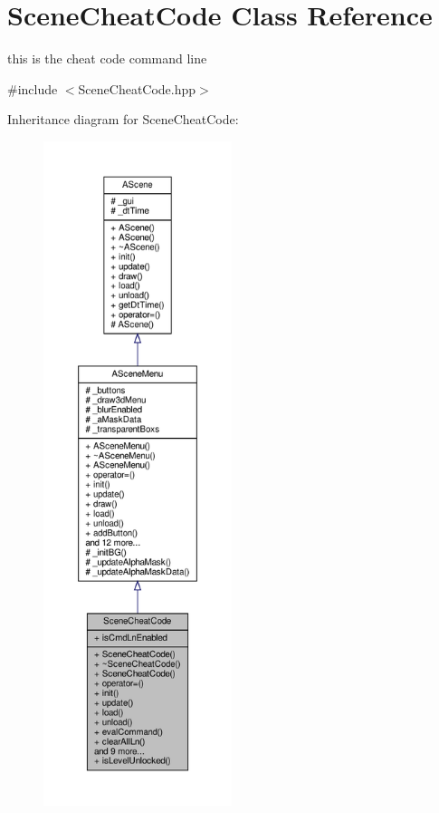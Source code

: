 \hypertarget{class_scene_cheat_code}{}\section{Scene\+Cheat\+Code Class Reference}
\label{class_scene_cheat_code}


this is the cheat code command line  




{\ttfamily \#include $<$Scene\+Cheat\+Code.\+hpp$>$}



Inheritance diagram for Scene\+Cheat\+Code\+:
\nopagebreak
\begin{figure}[H]
\begin{center}
\leavevmode
\includegraphics[height=550pt]{class_scene_cheat_code__inherit__graph}
\end{center}
\end{figure}


